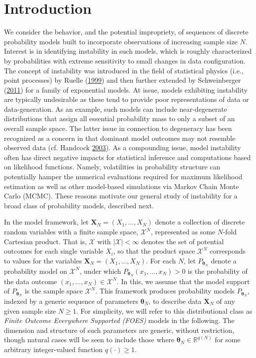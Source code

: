 \documentclass[]{article}
\theoremstyle{definition}
\begin{document}
\section{Introduction}\label{introduction}

We consider the behavior, and the potential impropriety, of sequences of
discrete probability models built to incorporate observations of
increasing sample size \(N\). Interest is in identifying instability in
such models, which is roughly characterized by probabilities with
extreme sensitivity to small changes in data configuration. The concept
of instability was introduced in the field of statistical physics (i.e.,
point processes) by Ruelle
(\protect\hyperlink{ref-ruelle1999statistical}{1999}) and then further
extended by Schweinberger
(\protect\hyperlink{ref-schweinberger2011instability}{2011}) for a
family of exponential models. At issue, models exhibiting instability
are typically undesirable as these tend to provide poor representations
of data or data-generation. As an example, such models can include
near-degenerate distributions that assign all essential probability mass
to only a subset of an overall sample space. The latter issue in
connection to degeneracy has been recognized as a concern in that
dominant model outcomes may not resemble observed data (cf. Handcock
\protect\hyperlink{ref-handcock2003assessing}{2003}). As a compounding
issue, model instability often has direct negative impacts for
statistical inference and computations based on likelihood functions.
Namely, volatilities in probability structure can potentially hamper the
numerical evaluations required for maximum likelihood estimation as well
as other model-based simulations via Markov Chain Monte Carlo (MCMC).
These reasons motivate our general study of instability for a broad
class of probability models, described next.

In the model framework, let \(\boldsymbol X_N = (X_1, \dots, X_N)\)
denote a collection of discrete random variables with a finite sample
space, \(\mathcal{X}^N\), represented as some \(N\)-fold Cartesian
product. That is, \(\mathcal{X}\) with \(|\mathcal{X}| < \infty\)
denotes the set of potential outcomes for each single variable \(X_i\),
so that the product space \(\mathcal{X}^N\) corresponds to values for
the variables \(\boldsymbol X_N=(X_1,\ldots,X_N)\). For each \(N\), let
\(P_{\boldsymbol \theta_N}\) denote a probability model on
\(\mathcal{X}^N\), under which
\(P_{\boldsymbol \theta_N}(x_1, \dots, x_N) > 0\) is the probability of
the data outcome \((x_1, \dots, x_N) \in \mathcal{X}^N\). In this, we
assume that the model support of \(P_{\boldsymbol \theta_N}\) is the
sample space \(\mathcal{X}^N\). This framework produces probability
models \(P_{\boldsymbol \theta_N}\), indexed by a generic sequence of
parameters \(\boldsymbol \theta_N\), to describe data
\(\boldsymbol X_N\) of any given sample size \(N \geq 1\). For
simplicity, we will refer to this distributional class as \emph{Finite
Outcome Everywhere Supported (FOES)} models in the following. The
dimension and structure of such parameters are generic, without
restriction, though natural cases will be seen to include those where
\(\boldsymbol \theta_N \in \mathbb{R}^{q(N)}\) for some arbitrary
integer-valued function \(q(\cdot) \geq 1\).
\end{document}
